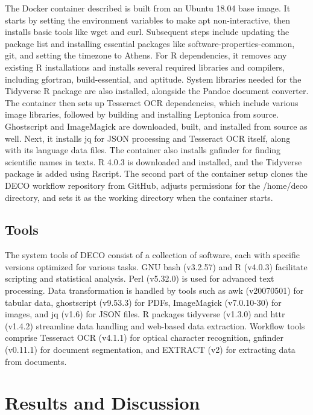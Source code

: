 The Docker container described is built from an Ubuntu 18.04 base image.
It starts by setting the environment variables to make apt non-interactive,
then installs basic tools like wget and curl. Subsequent steps include updating
the package list and installing essential packages like software-properties-common, git, and setting the timezone to Athens.
For R dependencies, it removes any existing R installations and installs
several required libraries and compilers, including gfortran, build-essential, and aptitude.
System libraries needed for the Tidyverse R package \parencite{Wickham2019tidy} are also installed, alongside the Pandoc document converter.
The container then sets up Tesseract OCR dependencies, which include various
image libraries, followed by building and installing Leptonica from source.
Ghostscript and ImageMagick are downloaded, built, and installed from source as well.
Next, it installs jq for JSON processing and Tesseract OCR itself, along with its
language data files. The container also installs gnfinder for finding scientific names in texts.
R 4.0.3 is downloaded and installed, and the Tidyverse package is added using Rscript.
The second part of the container setup clones the DECO workflow repository from GitHub,
adjusts permissions for the /home/deco directory, and sets it as the working directory when the container starts.

\subsection{Tools}
The system tools of DECO consist of a collection of software, each with
specific versions optimized for various tasks. GNU bash (v3.2.57) and R (v4.0.3)
facilitate scripting and statistical analysis. Perl (v5.32.0) is used for advanced text processing.
Data transformation is handled by tools such as awk (v20070501) for tabular data,
ghostscript (v9.53.3) for PDFs, ImageMagick (v7.0.10-30) for images,
and jq (v1.6) for JSON files.
R packages tidyverse (v1.3.0) and httr (v1.4.2) streamline data handling and web-based data extraction.
Workflow tools comprise Tesseract OCR (v4.1.1) for optical character recognition,
gnfinder (v0.11.1) for document segmentation, and EXTRACT (v2) for extracting data from documents.

\section{Results and Discussion}
\label{sec:deco-results}

